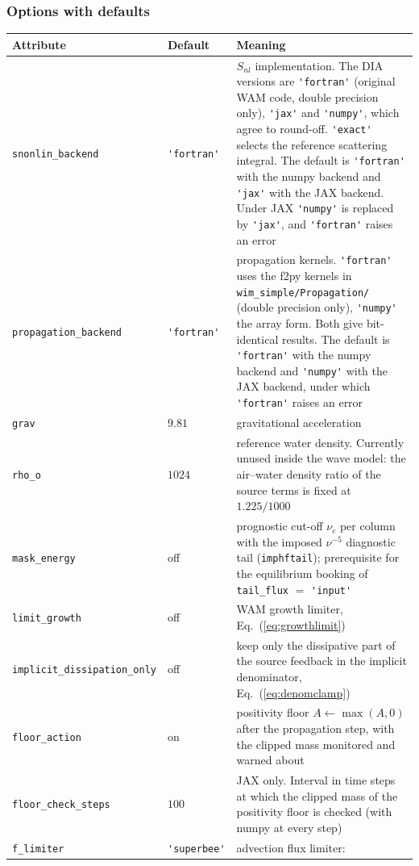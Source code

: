 \documentclass[12pt]{article}
\newcommand{\eq }  [1]{Eq.~(\ref{#1})}  %
\begin{document}
\subsubsection*{Options with defaults}

\begin{longtable}{@{}llp{8.2cm}@{}}
\hline
Attribute & Default & Meaning \\
\hline
\endhead
\verb|snonlin_backend| & \verb|'fortran'| & $S_{nl}$
  implementation. The DIA versions are \verb|'fortran'| (original WAM code,
  double precision only), \verb|'jax'| and \verb|'numpy'|, which agree
  to round-off. \verb|'exact'| selects the reference scattering
  integral. The default is \verb|'fortran'| with the numpy backend and
  \verb|'jax'| with the JAX backend. Under JAX \verb|'numpy'| is replaced by
  \verb|'jax'|, and \verb|'fortran'| raises an error \\
\verb|propagation_backend| & \verb|'fortran'| & propagation
  kernels. \verb|'fortran'| uses the f2py kernels in
  \verb|wim_simple/Propagation/| (double precision only), \verb|'numpy'| the
  array form. Both give bit-identical results. The default is
  \verb|'fortran'| with the numpy backend and \verb|'numpy'| with the JAX
  backend, under which \verb|'fortran'| raises an error \\
\verb|grav| & $9.81$ & gravitational acceleration \\
\verb|rho_o| & $1024$ & reference water density. Currently unused inside the
  wave model: the air--water density ratio of the source terms is fixed at
  $1.225/1000$ \\
\verb|mask_energy| & off & prognostic cut-off $\nu_c$ per column with the
  imposed $\nu^{-5}$ diagnostic tail (\verb|imphftail|); prerequisite for the
  equilibrium booking of \verb|tail_flux| $=$ \verb|'input'| \\
\verb|limit_growth| & off & WAM growth limiter, \eq{eq:growthlimit} \\
\verb|implicit_dissipation_only| & off & keep only the dissipative part of the
  source feedback in the implicit denominator, \eq{eq:denomclamp} \\
\verb|floor_action| & on & positivity floor $A \leftarrow \max(A,0)$ after the
  propagation step, with the clipped mass monitored and warned about \\
\verb|floor_check_steps| & $100$ & JAX only. Interval in time steps at which
  the clipped mass of the positivity floor is checked (with numpy at every
  step) \\
\verb|f_limiter| & \verb|'superbee'| & advection flux limiter:

\end{longtable}
\end{document}
